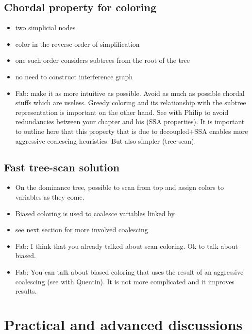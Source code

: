 {\subsection{Chordal property for coloring}
\begin{itemize}
  \item two simplicial nodes
  \item color in the reverse order of simplification
  \item one such order considers subtrees from the root of the tree
  \item no need to construct interference graph
  \item Fab: make it as more intuitive as possible. Avoid as much as possible chordal stuffs which are useless. Greedy coloring and its relationship with the subtree representation is important on the other hand. See with Philip to avoid redundancies between your chapter and his (SSA properties). It is important to outline here that this property that is due to decoupled+SSA enables more aggressive coalescing heuristics. But also simpler (tree-scan).
\end{itemize}

\subsection{Fast tree-scan solution}
\begin{itemize}
  \item On the dominance tree, possible to scan from top and assign colors to 
    variables as they come.
  \item Biased coloring is used to coalesce variables linked by \phifuns.
  \item see next section for more involved coalescing
  \item Fab: I think that you already talked about scan coloring. Ok to talk about biased.
  \item Fab: You can talk about biased coloring that uses the result of an aggressive coalescing (see with Quentin). It is not more complicated and it improves results.
\end{itemize}



\section{Practical and advanced discussions}

}
